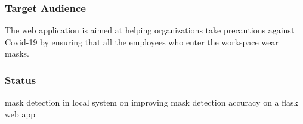 \documentclass[14pt]{beamer}
\newcounter{saveenumerate}
\newcommand{\restartenumerate}{\setcounter{enumi}{\value{saveenumerate}}}
\begin{document}
\begin{frame}
    \frametitle{Target Audience}
    The web application is  aimed at helping organizations take precautions against Covid-19 by ensuring that all the employees who enter the workspace wear masks.
\end{frame}

\begin{frame}
    \frametitle{Status}
    \begin{enumerate}
        \restartenumerate
        \implemented mask detection in local system
        \working on improving mask detection accuracy
        \Working on a flask web app
    \end{enumerate}
\end{frame}
\end{document}
